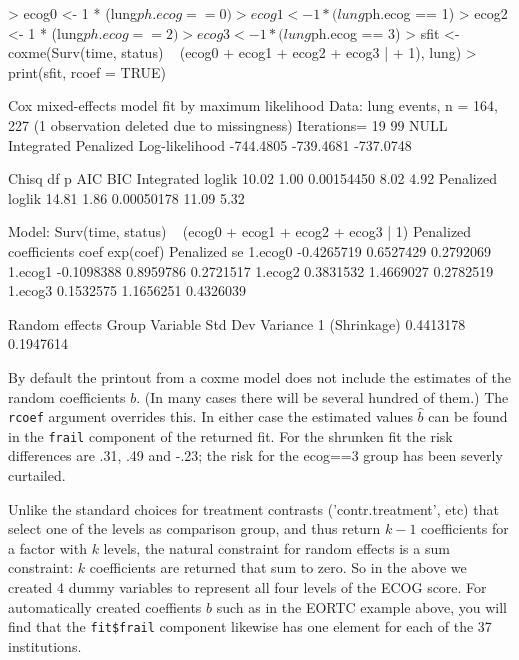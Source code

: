 \documentclass{article}
\begin{document}
\begin{Schunk}
\begin{Sinput}
> ecog0 <- 1 * (lung$ph.ecog == 0)
> ecog1 <- 1 * (lung$ph.ecog == 1)
> ecog2 <- 1 * (lung$ph.ecog == 2)
> ecog3 <- 1 * (lung$ph.ecog == 3)
> sfit <- coxme(Surv(time, status) ~ (ecog0 + ecog1 + ecog2 + ecog3 | 
+     1), lung)
> print(sfit, rcoef = TRUE)
\end{Sinput}
\begin{Soutput}
Cox mixed-effects model fit by maximum likelihood
  Data: lung
  events, n = 164, 227 (1 observation deleted due to missingness)
  Iterations= 19 99 
                    NULL Integrated Penalized
Log-likelihood -744.4805  -739.4681 -737.0748

                  Chisq   df          p   AIC  BIC
Integrated loglik 10.02 1.00 0.00154450  8.02 4.92
 Penalized loglik 14.81 1.86 0.00050178 11.09 5.32

Model:  Surv(time, status) ~ (ecog0 + ecog1 + ecog2 + ecog3 | 1) 
Penalized coefficients
              coef exp(coef) Penalized se
1.ecog0 -0.4265719 0.6527429    0.2792069
1.ecog1 -0.1098388 0.8959786    0.2721517
1.ecog2  0.3831532 1.4669027    0.2782519
1.ecog3  0.1532575 1.1656251    0.4326039

Random effects
 Group Variable    Std Dev   Variance 
 1     (Shrinkage) 0.4413178 0.1947614
\end{Soutput}
\end{Schunk}
By default the printout from a coxme model does not include the 
estimates of the random coefficients $b$.
(In many cases there will be several hundred of them.)
The \texttt{rcoef} argument overrides this.  In either case the
estimated values $\hat b$
can be found in the \texttt{frail} component of the returned fit.
For the shrunken fit the risk differences are .31, .49 and -.23; 
the risk for the ecog==3 group has been severly curtailed.

Unlike the standard choices for treatment contrasts ('contr.treatment', etc)
that select one of the levels as comparison group, and thus return $k-1$
coefficients for a factor with $k$ levels, the natural constraint for
random effects is a sum constraint: $k$ coefficients are returned that sum
to zero.  So in the above we created 4 dummy variables to represent all
four levels of the ECOG score.  
For automatically created coeffients $b$ such as in the EORTC example
above, you will find that the \texttt{fit\$frail} component likewise
has one element for each of the 37 institutions.
\end{document}
